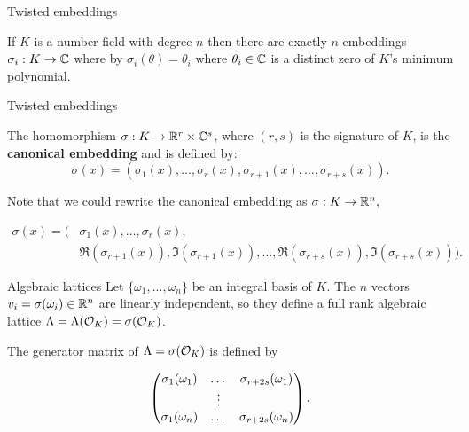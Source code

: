 \documentclass[notheorems, bigger]{beamer}
\begin{document}
\begin{frame}[label={sec:orgac1f6a1}]{Twisted embeddings}
\begin{theorem}
  If $K$ is a number field with degree $n$ then there are
  exactly $n$ embeddings $\sigma_i : K \rightarrow \mathbb{C}$ where by $\sigma_i(\theta) =
  \theta_i$ where $\theta_i \in \mathbb{C}$ is a distinct zero of $K$'s
  minimum polynomial.
\end{theorem}
\end{frame}

\begin{frame}[label={sec:org5c35171}]{Twisted embeddings}
\begin{text}
  The homomorphism $\sigma: K \rightarrow \mathbb{R}^r \times \mathbb{C}^s$, where $(r,s)$ is the signature of $K$, is the \textbf{canonical embedding} and is defined by:
  \[
  \sigma(x) = \left(\sigma_1(x), \ldots , \sigma_r(x), \sigma_{r+1}(x), \ldots, \sigma_{r+s}(x) \right).
\]

  Note that we could rewrite the canonical embedding as $\sigma : K \rightarrow \mathbb{R}^n,$

  \begin{align*}
    \sigma(x) = (& \sigma_1(x), \ldots , \sigma_r(x), \\
            & \Re(\sigma_{r+1}(x)), \Im(\sigma_{r+1}(x)), \ldots, \Re(\sigma_{r+s}(x)), \Im(\sigma_{r+s}(x)) ).
  \end{align*}

\end{text}
\end{frame}
\begin{frame}[label={sec:org7742a47}]{Algebraic lattices}
Let \(\{\omega_1,...,\omega_n\}\) be an integral basis of \(K\). The \(n\) vectors \(v_i = \sigma(\omega_i)
\in \mathbb{R}^n\) are linearly independent, so they define a full rank algebraic lattice
\(\Lambda = \Lambda(\mathcal{O}_K) = \sigma(\mathcal{O}_K)\).

The generator matrix of \(\Lambda = \sigma(\mathcal{O}_K)\) is defined by

\begin{equation*}
  \label{definition:gen-matrix-alg-lattices}
  \begin{pmatrix}
    \sigma_1(\omega_1) & $\dots$ &  \sigma_{r+2s}(\omega_1) \\
    & \vdots & \\
    \sigma_1(\omega_n) & $\dots$ & \sigma_{r+2s}(\omega_n) \\
  \end{pmatrix}.  
\end{equation*}
\end{frame}
\end{document}
